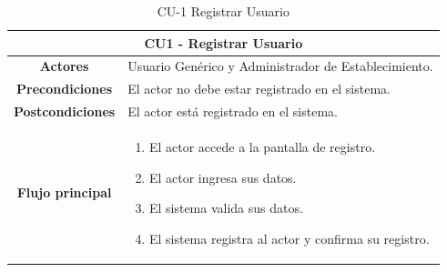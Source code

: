 \begin{table}[h]
    \centering
    \begin{tabular}{|c|p{10cm}|}
        \hline
        \multicolumn{2}{|c|}{\textbf{CU1 - Registrar Usuario}}                               \\
        \hline
        \textbf{Actores}         & Usuario Genérico y Administrador de Establecimiento.      \\
        \hline
        \textbf{Precondiciones}  & El actor no debe estar registrado en el sistema.          \\
        \hline
        \textbf{Postcondiciones} & El actor está registrado en el sistema.                   \\
        \hline
        \textbf{Flujo principal} & \begin{enumerate}
                                       \item El actor accede a la pantalla de registro.
                                       \item El actor ingresa sus datos.
                                       \item El sistema valida sus datos.
                                       \item El sistema registra al actor y confirma su registro.
                                   \end{enumerate} \\
        \hline
    \end{tabular}
    \caption{CU-1 Registrar Usuario}
\end{table}

